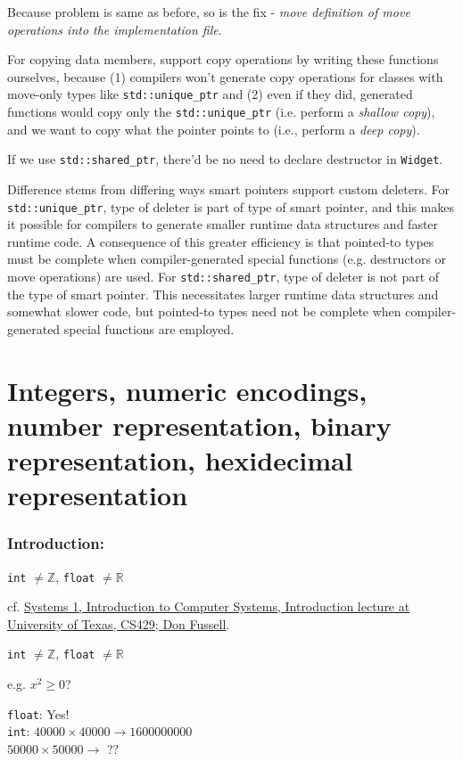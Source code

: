 \documentclass[10pt]{amsart}
\begin{document}
Because problem is same as before, so is the fix - \emph{move definition of move operations into the implementation file}.  

For copying data members, support copy operations by writing these functions ourselves, because (1) compilers won't generate copy operations for classes with move-only types like \verb|std::unique_ptr| and (2) even if they did, generated functions would copy only the \verb|std::unique_ptr| (i.e. perform a \emph{shallow copy}), and we want to copy what the pointer points to (i.e., perform a \emph{deep copy}).  

If we use \verb|std::shared_ptr|, there'd be no need to declare destructor in \verb|Widget|.  

Difference stems from differing ways smart pointers support custom deleters.  For \verb|std::unique_ptr|, type of deleter is part of type of smart pointer, and this makes it possible for compilers to generate smaller runtime data structures and faster runtime code.  A consequence of this greater efficiency is that pointed-to types must be complete when compiler-generated special functions (e.g. destructors or move operations) are used.  For \verb|std::shared_ptr|, type of deleter is not part of the type of smart pointer.  This necessitates larger runtime data structures and somewhat slower code, but pointed-to types need not be complete when compiler-generated special functions are employed.  

\part{Integers, numeric encodings, number representation, binary representation, hexidecimal representation}

\section{Introduction:} 
\texttt{int} $\neq \mathbb{Z}$, \texttt{float} $\neq \mathbb{R}$

cf. \href{https://www.cs.utexas.edu/users/fussell/courses/cs429h/lectures/Lecture_1-429h.pdf}{Systems 1, Introduction to Computer Systems, Introduction lecture at University of Texas, CS429; Don Fussell}.

\texttt{int} $\neq \mathbb{Z}$, \texttt{float} $\neq \mathbb{R}$

e.g. $x^2 \geq 0$? 

\texttt{float}: Yes!  \\
\texttt{int}: $40000 \times 40000 \to 1600000000$ \\
\phantom{int} $50000 \times 50000 \to $ ??
\end{document}

